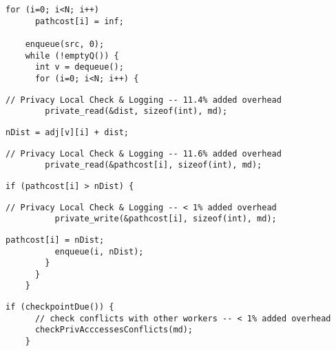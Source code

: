   \begin{lstlisting}[morekeywords={pathcost},aboveskip=0pt, belowskip=0pt, firstnumber=auto,name=dij_checks]
    for (i=0; i<N; i++)
      pathcost[i] = inf;

    enqueue(src, 0);
    while (!emptyQ()) {
      int v = dequeue();
      for (i=0; i<N; i++) {
  \end{lstlisting}

  \begin{lstlisting}[morekeywords={pathcost,dist}, aboveskip=0pt,belowskip=0pt,backgroundcolor=\color{lightgray},
  firstnumber=auto, name=dij_checks]
        // Privacy Local Check & Logging -- 11.4% added overhead
        private_read(&dist, sizeof(int), md);
  \end{lstlisting}

  \begin{lstlisting}[morekeywords={pathcost,dist}, aboveskip=0pt, belowskip=0pt, firstnumber=auto,name=dij_checks]
        nDist = adj[v][i] + dist;
  \end{lstlisting}

  \begin{lstlisting}[morekeywords={pathcost}, aboveskip=0pt,belowskip=0pt,backgroundcolor=\color{lightgray},
  firstnumber=auto, name=dij_checks]
        // Privacy Local Check & Logging -- 11.6% added overhead
        private_read(&pathcost[i], sizeof(int), md);
  \end{lstlisting}


  \begin{lstlisting}[morekeywords={pathcost}, aboveskip=0pt, belowskip=0pt, firstnumber=auto,name=dij_checks]
        if (pathcost[i] > nDist) {
  \end{lstlisting}

  \begin{lstlisting}[morekeywords={pathcost}, aboveskip=0pt,belowskip=0pt,backgroundcolor=\color{lightgray},
  firstnumber=auto, name=dij_checks]
          // Privacy Local Check & Logging -- < 1% added overhead
          private_write(&pathcost[i], sizeof(int), md);
  \end{lstlisting}

  \begin{lstlisting}[morekeywords={pathcost}, aboveskip=0pt, belowskip=0pt, firstnumber=auto,name=dij_checks]
          pathcost[i] = nDist;
          enqueue(i, nDist);
        }
      }
    }
    \end{lstlisting}

  \begin{lstlisting}[morekeywords={pathcost}, aboveskip=0pt,belowskip=0pt,backgroundcolor=\color{lightgray},
  firstnumber=auto, name=dij_checks]
    if (checkpointDue()) {
      // check conflicts with other workers -- < 1% added overhead
      checkPrivAcccessesConflicts(md);
    }
  \end{lstlisting}


